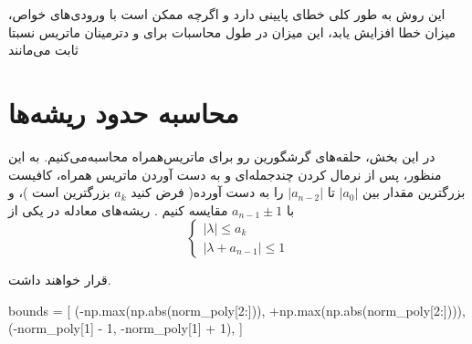 این روش به طور کلی خطای‌ پایینی دارد و اگرچه ممکن است با ورودی‌های خواص، میزان خطا افزایش یابد،
این میزان در طول محاسبات برای
و دترمینان ماتریس نسبتا ثابت می‌مانند~\cite{edelman1995polynomial}

\section{محاسبه حدود ریشه‌ها}

در این بخش، حلقه‌های گرشگورین رو برای ماتریس‌همراه محاسبه‌می‌کنیم.
به این منظور، پس از نرمال کردن چندجمله‌ای و به دست آوردن ماتریس همراه، کافیست بزرگترین مقدار بین
$|a_0|$
تا
$|a_{n-2}|$
را به دست آورده(
فرض کنید
$a_k$
بزرگترین
است
)، و با
$a_{n-1} \pm 1$
مقایسه کنیم
.
ریشه‌های معادله در یکی از
\begin{equation}
  \begin{cases}
    | \lambda | \le a_k  \\
    | \lambda + a_{n-1} | \le 1
  \end{cases}
\end{equation}

قرار خواهند داشت.



\begin{latin}
  \begin{python}

    bounds = [
      (-np.max(np.abs(norm_poly[2:])), +np.max(np.abs(norm_poly[2:]))),
      (-norm_poly[1] - 1, -norm_poly[1] + 1),
    ]

  \end{python}
\end{latin}



